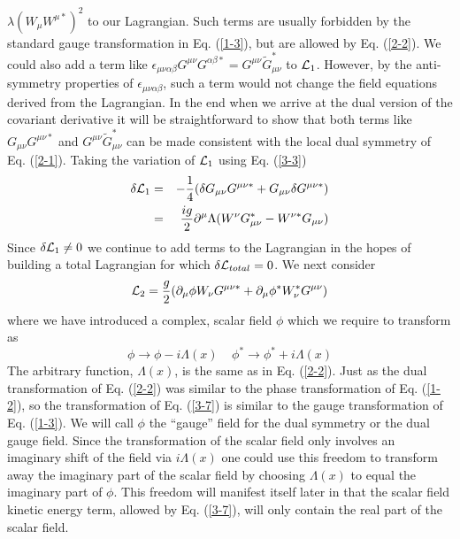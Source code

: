 \documentclass[a4paper,aps]{revtex4}
\begin{document}
$\lambda (W_{\mu} W^{\mu \ast})^2$ to our Lagrangian. Such terms
are usually forbidden by the standard gauge transformation in
Eq. (\ref{1-3}), but are allowed by Eq. (\ref{2-2}). We could
also add a term like $\epsilon _{\mu \nu \alpha \beta} G^{\mu \nu}
G^{\alpha \beta \ast} = G^{\mu \nu} {\widetilde G}_{\mu \nu}^{\ast}$ to
${\cal L}_1$. However, by the anti-symmetry properties
of $\epsilon_{\mu \nu \alpha \beta}$,
such a term would not change the field equations
derived from the Lagrangian. In the end when we arrive
at the dual version of the covariant derivative it will be
straightforward to show that both terms like $G_{\mu \nu}
G^{\mu \nu \ast}$ and $G^{\mu \nu} {\widetilde G}_{\mu \nu}^{\ast}$ can
be made consistent with the local dual symmetry of
Eq. (\ref{2-1}). Taking the variation of ${\cal L}_1$ using
Eq. (\ref{3-3})
\begin{eqnarray}
\label{3-5}
\delta {\cal L}_1 &=& -\frac{1}{4}(\delta G_{\mu \nu} G^{\mu \nu \ast}
+G_{\mu \nu} \delta G^{\mu \nu \ast}) \nonumber \\
&=& \frac{i g}{2} \partial ^{\mu} \Lambda
(W^{\nu} G_{\mu \nu} ^{\ast} - W^{\nu \ast} G_{\mu \nu})
\end{eqnarray}
Since $\delta {\cal L} _1 \ne 0$ we continue to
add terms to the Lagrangian in the hopes of building
a total Lagrangian for which $\delta {\cal L} _{total} = 0$.
We next consider
\begin{equation}
\label{3-6}
{\cal L} _2 = \frac{g}{2}(\partial _{\mu} \phi W_{\nu} G^{\mu \nu \ast}
+\partial _{\mu} \phi ^{\ast} W_{\nu} ^{\ast} G^{\mu \nu})
\end{equation}
where we have introduced a complex, scalar field $\phi$ which
we require to transform as
\begin{equation}
\label{3-7}
\phi \rightarrow \phi - i \Lambda (x)
\; \; \; \;
\phi^{\ast} \rightarrow \phi ^{\ast} + i \Lambda (x)
\end{equation}
The arbitrary function, $\Lambda (x)$, is the same
as in Eq. (\ref{2-2}). Just as the dual transformation of
Eq. (\ref{2-2}) was similar to the phase transformation of
Eq. (\ref{1-2}), so the transformation of Eq. (\ref{3-7})
is similar to the gauge transformation of Eq. (\ref{1-3}).
We will call $\phi$ the ``gauge'' field for the dual symmetry or
the dual gauge field. Since the transformation of the scalar
field only involves an imaginary shift of the field via
$i \Lambda (x)$ one could use this freedom to transform
away the imaginary part of the scalar field by choosing
$\Lambda (x)$ to equal the imaginary part of $\phi$.
This freedom will manifest itself later in that the
scalar field kinetic energy term, allowed by Eq. (\ref{3-7}),
will only contain the real part of the scalar field.
\end{document}
